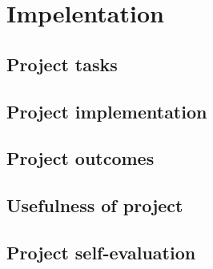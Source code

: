 \chapter{Impelentation}\label{ch:impelentation}


\section{Project tasks}\label{sec:project-tasks}



\section{Project implementation}\label{sec:project-implementation}



\section{Project outcomes}\label{sec:project-outcomes}



\section{Usefulness of project}\label{sec:usefulness-of-project}



\section{Project self-evaluation}\label{sec:project-self-evaluation}



%


%

